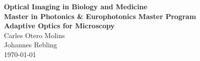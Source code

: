 \documentclass[
a4paper,        			%
DIV=12,
11pt,						%
BCOR=10mm,					%
oneside,					%
headings = normal,			%
listof=totoc,				%
bibliography=totoc,			%
]
{scrartcl}
\begin{document}
\begin{center}
\Large
\textbf{Optical Imaging in Biology and Medicine\\
Master in Photonics \& Europhotonics Master Program\\
\vspace{1em}
\huge 
Adaptive Optics for Microscopy}\\
\vspace{2em}
\Large
Carles Otero Molins\\
Johannes Rebling\\
\vspace{.2em}
\today
\end{center}

\pagestyle{empty}



 
\tableofcontents
\clearpage

\pagestyle{fancy}      %
\setcounter{page}{1}






\clearpage

\clearpage

%
\end{document}
